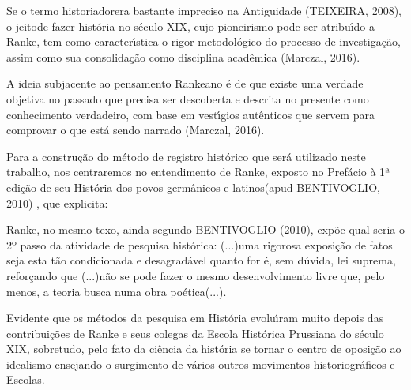 \documentclass[
12pt,		%
openright,	%
twoside,  %
a4paper,			%
chapter=TITLE,		%
english,			%
french,				%
spanish,			%
brazil				%
]{USPSC-classe/USPSC}
\begin{document}
Se o termo \textquotedbl historiador\textquotedbl  era bastante impreciso na Antiguidade (TEIXEIRA, 2008), o \textquotedbl jeito\textquotedbl  de fazer hist\'oria no s\'eculo XIX, cujo pioneirismo pode ser atribu\'{\i}do a Ranke, tem como caracter\'{\i}stica \textquotedbl o rigor metodol\'ogico do processo de investiga\c{c}\~ao\textquotedbl , assim como sua consolida\c{c}\~ao como disciplina acad\^emica (Marczal, 2016).


A ideia subjacente ao pensamento Rankeano \'e de que existe uma verdade objetiva no passado que precisa ser descoberta e descrita no presente como \textquotedbl conhecimento verdadeiro\textquotedbl , com base em vest\'{\i}gios aut\^enticos que servem para comprovar o que est\'a sendo narrado (Marczal, 2016).


Para a constru\c{c}\~ao do m\'etodo de registro hist\'orico que ser\'a utilizado neste trabalho, nos centraremos no entendimento de Ranke, exposto no Pref\'acio \`a 1ª edi\c{c}\~ao de seu \textquotedbl Hist\'oria dos povos germ\^anicos e latinos\textquotedbl   (apud BENTIVOGLIO, 2010) , que explicita:



\noindent\begin{center}\mbox{\centering{}}\end{center}


Ranke, no mesmo texo, ainda segundo  BENTIVOGLIO (2010), exp\~oe qual seria o 2º passo da atividade de pesquisa hist\'orica: \textquotedbl (...)uma rigorosa exposi\c{c}\~ao de fatos seja esta t\~ao condicionada e desagrad\'avel quanto for \'e, sem d\'uvida, lei suprema\textquotedbl , refor\c{c}ando que \textquotedbl (...)n\~ao se pode fazer o mesmo desenvolvimento livre que, pelo menos, a teoria busca numa obra po\'etica(...)\textquotedbl .


Evidente que os m\'etodos da pesquisa em Hist\'oria evolu\'{\i}ram muito depois das contribui\c{c}\~oes de Ranke e seus colegas da Escola Hist\'orica Prussiana do s\'eculo XIX, sobretudo, pelo fato da ci\^encia  da hist\'oria se tornar o centro de oposi\c{c}\~ao ao idealismo ensejando o surgimento de v\'arios outros movimentos historiogr\'aficos e Escolas.
\end{document}
